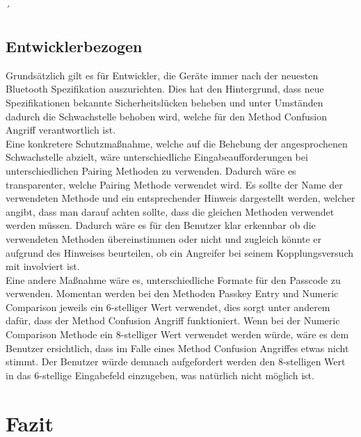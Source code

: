 ´\documentclass[
    a4paper,
    pagesize,
    pdftex,
    12pt,
]{scrartcl}
\begin{document}
\subsection{Entwicklerbezogen}
    Grundsätzlich gilt es für Entwickler, die Geräte immer nach der neuesten Bluetooth Spezifikation auszurichten. Dies hat den Hintergrund, dass neue Spezifikationen bekannte Sicherheitslücken beheben und unter Umständen dadurch die Schwachstelle behoben wird, welche für den Method Confusion Angriff verantwortlich ist. \cite{bluetooth_newest_security_risks} \\
    Eine konkretere Schutzmaßnahme, welche auf die Behebung der angesprochenen Schwachstelle abzielt, wäre unterschiedliche Eingabeaufforderungen bei unterschiedlichen Pairing Methoden zu verwenden. Dadurch wäre es transparenter, welche Pairing Methode verwendet wird. Es sollte der Name der verwendeten Methode und ein entsprechender Hinweis dargestellt werden, welcher angibt, dass man darauf achten sollte, dass die gleichen Methoden verwendet werden müssen. Dadurch wäre es für den Benutzer klar erkennbar ob die verwendeten Methoden übereinstimmen oder nicht und zugleich könnte er aufgrund des Hinweises beurteilen, ob ein Angreifer bei seinem Kopplungsversuch mit involviert ist. \cite{bluetooth_formal_analysis} \\
    Eine andere Maßnahme wäre es, unterschiedliche Formate für den Passcode zu verwenden. Momentan werden bei den Methoden Passkey Entry und Numeric Comparison jeweils ein 6-stelliger Wert verwendet, dies sorgt unter anderem dafür, dass der Method Confusion Angriff funktioniert. Wenn bei der Numeric Comparison Methode ein 8-stelliger Wert verwendet werden würde, wäre es dem Benutzer ersichtlich, dass im Falle eines Method Confusion Angriffes etwas nicht stimmt. Der Benutzer würde demnach aufgefordert werden den 8-stelligen Wert in das 6-stellige Eingabefeld einzugeben, was natürlich nicht möglich ist. \cite{bluetooth_formal_analysis}
    
    \newpage
\section{Fazit}

    \newpage

    
    
\end{document}
